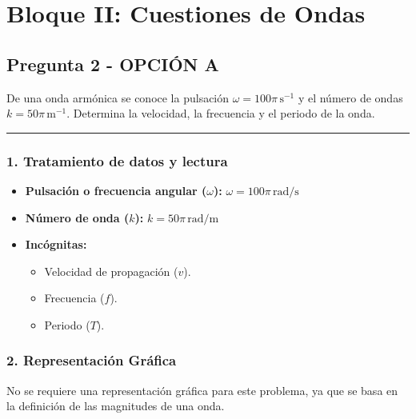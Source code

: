 \newpage

\section{Bloque II: Cuestiones de Ondas}
\label{sec:ondas_2002_sep_ext}

\subsection{Pregunta 2 - OPCIÓN A}
\label{subsec:2A_2002_sep_ext}

\begin{cajaenunciado}
De una onda armónica se conoce la pulsación $\omega=100\pi\,\text{s}^{-1}$ y el número de ondas $k=50\pi\,\text{m}^{-1}$. Determina la velocidad, la frecuencia y el periodo de la onda.
\end{cajaenunciado}
\hrule

\subsubsection*{1. Tratamiento de datos y lectura}
\begin{itemize}
    \item \textbf{Pulsación o frecuencia angular ($\omega$):} $\omega = 100\pi \, \text{rad/s}$
    \item \textbf{Número de onda ($k$):} $k = 50\pi \, \text{rad/m}$
    \item \textbf{Incógnitas:}
        \begin{itemize}
            \item Velocidad de propagación ($v$).
            \item Frecuencia ($f$).
            \item Periodo ($T$).
        \end{itemize}
\end{itemize}

\subsubsection*{2. Representación Gráfica}
No se requiere una representación gráfica para este problema, ya que se basa en la definición de las magnitudes de una onda.

